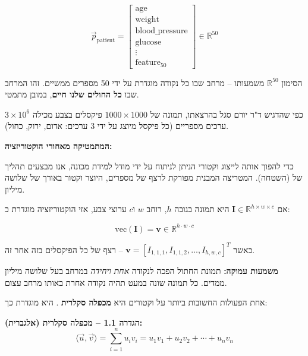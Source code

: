 \[
\vec{p}_{\text{patient}} = \begin{bmatrix}
\text{age} \\
\text{weight} \\
\text{blood\_pressure} \\
\text{glucose} \\
\vdots \\
\text{feature}_{50}
\end{bmatrix} \in \mathbb{R}^{50}
\]

הסימון $\mathbb{R}^{50}$ משמעותו  – מרחב שבו כל נקודה מוגדרת על ידי \num{50} מספרים ממשיים. זהו המרחב שבו \textbf{כל החולים שלנו חיים}, במובן מתמטי.


כפי שהדגיש ד"ר יורם סגל בהרצאתו, תמונה של $\num{1000} \times \num{1000}$ פיקסלים בצבע  מכילה $\num{3} \times \num{10}^6$ ערכים מספריים (כל פיקסל מיוצג על ידי \num{3} ערכים: אדום, ירוק, כחול).

\textbf{המתמטיקה מאחורי הוקטוריזציה:}

כדי להפוך אותה לייצוג וקטורי הניתן לניתוח על ידי מודל למידת מכונה, אנו מבצעים תהליך של  (השטחה). המטריצה המבנית מפורקת לרצף של מספרים, היוצר וקטור באורך של שלושה מיליון.

אם $\mathbf{I} \in \mathbb{R}^{h \times w \times c}$ היא תמונה בגובה $h$, רוחב $w$ ו\en{-}$c$ ערוצי צבע, אזי הוקטוריזציה מוגדרת כ:

\begin{equation}
\text{vec}(\mathbf{I}) = \mathbf{v} \in \mathbb{R}^{h \cdot w \cdot c}
\end{equation}

כאשר $\mathbf{v} = [I_{1,1,1}, I_{1,1,2}, \ldots, I_{h,w,c}]^T$ – רצף של כל הפיקסלים בזה אחר זה.

\textbf{משמעות עמוקה:} תמונת החתול הפכה לנקודה \textit{אחת ויחידה} במרחב בעל שלושה מיליון ממדים. כל תמונה שונה במעט תהיה נקודה אחרת באותו מרחב עצום.


אחת הפעולות החשובות ביותר על וקטורים היא \textbf{מכפלה סקלרית} . היא מוגדרת כך:

\textbf{הגדרה \num{1.1} – מכפלה סקלרית (אלגברית):}
\begin{equation}
\langle \vec{u}, \vec{v} \rangle = \sum_{i=1}^{n} u_i v_i = u_1 v_1 + u_2 v_2 + \cdots + u_n v_n
\end{equation}

